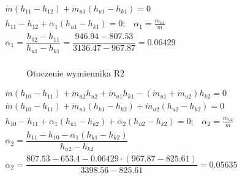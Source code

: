 \begin{math}
	\begin{array}{l}
		\dot m ( h_{11} - h_{12} ) + \dot m_{u1} ( h_{u1} - h_{k1} ) = 0 \\
		h_{11} - h_{12} + \alpha_1 ( h_{u1} - h_{k1} ) = 0;
			\;\;\; \alpha_1 = \frac{\dot m_{u1}}{\dot m} \\
		\alpha_1 = \dfrac{h_{12} - h_{11}}{h_{u1} - h_{k1}}
			= \dfrac{\num{946,94} - \num{807,53}}{\num{3136,47} - \num{967,87}}
			= \num{0,06429} \\
	\end{array}
\end{math}

\begin{figure}[H]
	\centering

	\caption{Otoczenie wymiennika R2}
\end{figure}

\begin{math}
	\begin{array}{l}
		\dot m ( h_{10} - h_{11} ) + \dot m_{u2} h_{u2} + \dot m_{u1} h_{k1}
			- (\dot m_{u1} + \dot m_{u2}) h_{k2} = 0 \\
		\dot m ( h_{10} - h_{11} ) + \dot m_{u1} ( h_{k1} - h_{k2} )
			+ \dot m_{u2} ( h_{u2} - h_{k2} ) = 0 \\
		h_{10} - h_{11} + \alpha_1 ( h_{k1} - h_{k2} )
			+ \alpha_2 ( h_{u2} - h_{k2} ) = 0;
			\;\;\; \alpha_2 = \frac{\dot m_{u2}}{\dot m} \\

		\alpha_2 = \dfrac{h_{11} - h_{10} - \alpha_1 (h_{k1} - h_{k2})}{
				h_{u2} - h_{k2}} \\
		\alpha_2 = \dfrac{\num{807,53} - \num{653,4} - \num{0,06429} \cdot
				( \num{967,87} - \num{825,61} )}{\num{3398,56} - \num{825,61}}
				= \num{0,05635} \\
	\end{array}
\end{math}

